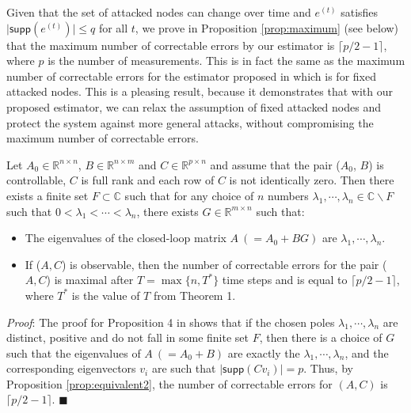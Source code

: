 \documentclass[../../thesis.tex]{subfiles}
\begin{document}
Given that the set of attacked nodes can change over time and $e^{(t)}$ satisfies $\lvert \textsf{supp} (e^{(t)}) \rvert \le q$ for all $t$, we prove in Proposition \ref{prop:maximum} (see below) that the maximum number of correctable errors by our estimator is $\lceil p/2-1 \rceil$, where $p$ is the number of measurements. This is in fact the same as the maximum number of correctable errors for the estimator proposed in \cite{Fawzi2014} which is for fixed attacked nodes.
This is a pleasing result, because it demonstrates that with our proposed estimator, we can relax the assumption of fixed attacked nodes and protect the system against more general attacks, without compromising the maximum number of correctable errors. 
\begin{proposition}\label{prop:maximum} 
Let $A_0 \in \mathbb{R}^{n \times n}$, $B \in \mathbb{R}^{n \times m}$ and $C \in \mathbb{R}^{p \times n}$ and assume that the pair ($A_0$, $B$) is controllable, $C$ is full rank and each row of $C$ is not identically zero. Then there exists a finite set $F \subset \mathbb{C}$ such that for any choice of $n$ numbers $\lambda_1, \cdots, \lambda_n \in \mathbb{C} \backslash F$ such that $0<\lambda_1< \cdots < \lambda_n$, there exists $G \in \mathbb{R}^{m \times n}$ such that:

\begin{itemize}
\item
The eigenvalues of the closed-loop matrix $A~(= A_0+BG)$ are $\lambda_1, \cdots, \lambda_n$.
\item
If ($A, C$) is observable, then the number of correctable errors for the pair ($A, C$) is maximal after $T= \max\{n, T^*\}$ time steps and is equal to $\lceil p/2-1 \rceil$, where $T^*$ is the value of $T$ from Theorem 1. 
\end{itemize}
\end{proposition}

\textit{Proof}:
The proof for Proposition 4 in \cite{Fawzi2014} shows that if the chosen poles $\lambda_1, \cdots, \lambda_n$ are distinct, positive and do not fall in some finite set $F$, then there is a choice of $G$ such that the eigenvalues of $A~(=A_0+B)$ are exactly the $\lambda_1, \cdots, \lambda_n$, and the corresponding eigenvectors $v_i$ are such that $\lvert \textsf{supp} (C v_i) \rvert = p$. Thus, by Proposition \ref{prop:equivalent2}, the number of correctable errors for $(A,C)$ is $\lceil p/2-1 \rceil$. \hfill$\blacksquare$
\end{document}
